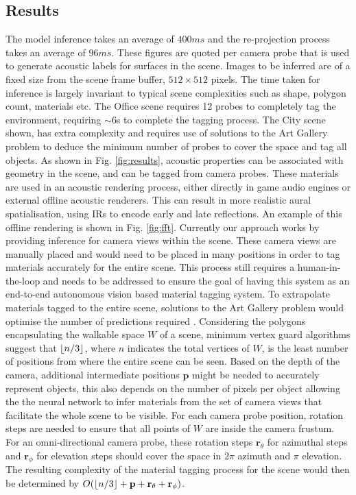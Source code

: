 \subsection{Results}
The model inference takes an average of $400 ms$ and the re-projection process takes an average of $96ms$. These figures are quoted per camera probe that is used to generate acoustic labels for surfaces in the scene. Images to be inferred are of a fixed size from the scene frame buffer, $512 \times 512$ pixels. The time taken for inference is largely invariant to typical scene complexities such as shape, polygon count, materials etc. The Office scene requires 12 probes to completely tag the environment, requiring $\sim$6s to complete the tagging process. The City scene shown, has extra complexity and requires use of solutions to the Art Gallery problem to deduce the minimum number of probes to cover the space and tag all objects. 
As shown in Fig. \ref{fig:results}, acoustic properties can be associated with geometry in the scene, and can be tagged from camera probes. These materials are used in an acoustic rendering process, either directly in game audio engines or external offline acoustic renderers. This can result in more realistic aural spatialisation, using IRs to encode early and late reflections. An example of this offline rendering is shown in Fig. \ref{fig:fft}. 
Currently our approach works by providing inference for camera views within the scene. These camera views are manually placed and would need to be placed in many positions in order to tag materials accurately for the entire scene. This process still requires a human-in-the-loop and needs to be addressed to ensure the goal of having this system as an end-to-end autonomous vision based material tagging system. 
To extrapolate materials tagged to the entire scene, solutions to the Art Gallery problem would optimise the number of predictions required \cite{devadoss2011discrete, bajuelos2008optimizing}. Considering the polygons encapsulating the walkable space $W$ of a scene, minimum vertex guard algorithms suggest that $\floor*{n/3}$, where $n$ indicates the total vertices of $W$, is the least number of positions from where the entire scene can be seen. Based on the depth of the camera, additional intermediate positions $\textbf{p}$ might be needed to accurately represent objects, this also depends on the number of pixels per object allowing the the neural network to infer materials from the set of camera views that facilitate the whole scene to be visible. For each camera probe position, rotation steps are needed to ensure that all points of $W$ are inside the camera frustum. For an omni-directional camera probe, these rotation steps $\textbf{r}_\theta$ for azimuthal steps and $\textbf{r}_\phi$ for elevation steps should cover the space in $2\pi$ azimuth and $\pi$ elevation. The resulting complexity of the material tagging process for the scene would then be determined by $O(\floor*{n/3} + \textbf{p} + \textbf{r}_\theta + \textbf{r}_\phi)$.

